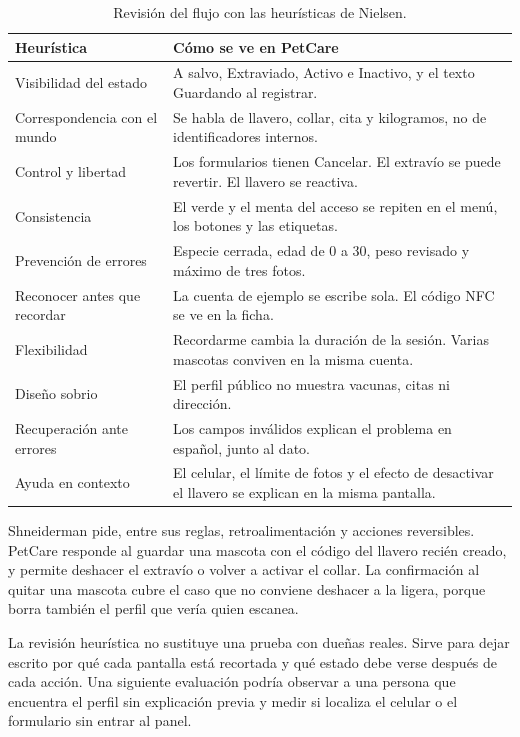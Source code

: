 \documentclass[12pt,a4paper]{article}
\begin{document}
\begin{table}[ht]
\centering
\small
\begin{tabularx}{\textwidth}{l X}
\toprule
\textbf{Heurística} & \textbf{Cómo se ve en PetCare} \\
\midrule
Visibilidad del estado & A salvo, Extraviado, Activo e Inactivo, y el texto Guardando al registrar. \\
Correspondencia con el mundo & Se habla de llavero, collar, cita y kilogramos, no de identificadores internos. \\
Control y libertad & Los formularios tienen Cancelar. El extravío se puede revertir. El llavero se reactiva. \\
Consistencia & El verde y el menta del acceso se repiten en el menú, los botones y las etiquetas. \\
Prevención de errores & Especie cerrada, edad de 0 a 30, peso revisado y máximo de tres fotos. \\
Reconocer antes que recordar & La cuenta de ejemplo se escribe sola. El código NFC se ve en la ficha. \\
Flexibilidad & Recordarme cambia la duración de la sesión. Varias mascotas conviven en la misma cuenta. \\
Diseño sobrio & El perfil público no muestra vacunas, citas ni dirección. \\
Recuperación ante errores & Los campos inválidos explican el problema en español, junto al dato. \\
Ayuda en contexto & El celular, el límite de fotos y el efecto de desactivar el llavero se explican en la misma pantalla. \\
\bottomrule
\end{tabularx}
\caption{Revisión del flujo con las heurísticas de Nielsen.}
\end{table}

Shneiderman pide, entre sus reglas, retroalimentación y acciones reversibles. PetCare responde al guardar una mascota con el código del llavero recién creado, y permite deshacer el extravío o volver a activar el collar. La confirmación al quitar una mascota cubre el caso que no conviene deshacer a la ligera, porque borra también el perfil que vería quien escanea.

La revisión heurística no sustituye una prueba con dueñas reales. Sirve para dejar escrito por qué cada pantalla está recortada y qué estado debe verse después de cada acción. Una siguiente evaluación podría observar a una persona que encuentra el perfil sin explicación previa y medir si localiza el celular o el formulario sin entrar al panel.
\end{document}
